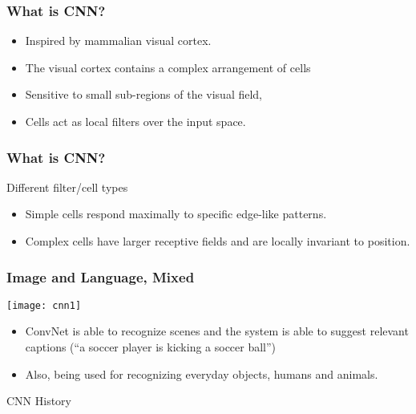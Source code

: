 \begin{frame}[fragile] \frametitle{What is CNN?}

\begin{itemize}
\item Inspired by mammalian visual cortex.
\item The visual cortex contains a complex arrangement of cells
\item Sensitive to small sub-regions of the visual field, 
\item Cells act as local filters over the input space.
\end{itemize}
\end{frame}

\begin{frame}[fragile] \frametitle{What is CNN?}

Different filter/cell types
\begin{itemize}
\item Simple cells respond maximally to specific edge-like patterns.
\item Complex cells have larger receptive fields and are locally invariant to position.

\end{itemize}
\end{frame}


\begin{frame}[fragile] \frametitle{Image and Language, Mixed}


\begin{center}
\texttt{[image: cnn1]}
\end{center}

 \begin{itemize}
\item  ConvNet is able to recognize scenes and the system is able to suggest relevant captions (``a soccer player is kicking a soccer ball'')
\item Also, being used for recognizing everyday objects, humans and animals.
\end{itemize}
\end{frame}


\begin{frame}
  \begin{center}
    {\Large CNN History}
  \end{center}
\end{frame}



